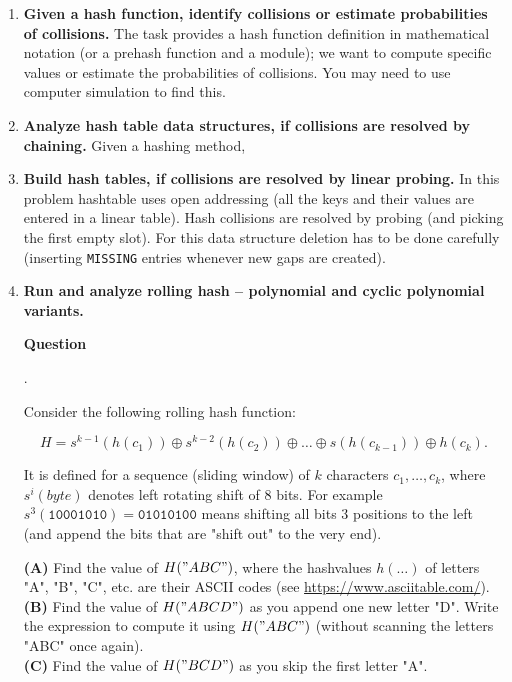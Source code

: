 \documentclass[a4paper,12pt]{article}
\newcounter{mcounter}
\newcommand\showmcounter{\addtocounter{mcounter}{1}\themcounter}
\begin{document}
{\begin{enumerate}[label=3.\Alph*.]
{\bf (A)} Implement map ADT using just some instances of "stack" data structure (instructors know how to implement
{\tt Map[Keys,Values]} with two instances of {\tt Stack[Keys]} and two instances of 
{\tt Stack[Values]}).\\
{\bf (B)} Implement map ADT using a Binary Search Tree (BST).\\
{\bf (C)} Implement map ADT using a hashtable.

For each of the three methods and three functions find the worst-case time complexity 
as $O(f(n))$, where $n$ -- the number of entries in Map right before the function is called.

\item {\bf Given a hash function, identify collisions or estimate probabilities of collisions.} 
The task provides a hash function definition in mathematical notation
(or a prehash function and a module);
we want to compute specific values or estimate the probabilities of collisions.
You may need to use computer simulation to find this. 



\item {\bf Analyze hash table data structures, if collisions are resolved by chaining.}
Given a hashing method, 
\item {\bf Build hash tables, if collisions are resolved by linear probing.}
In this problem hashtable uses open addressing (all the keys and their values are entered
in a linear table). Hash collisions are resolved by probing (and picking the first empty slot). 
For this data structure deletion has to be done carefully (inserting {\tt MISSING} entries
whenever new gaps are created). 
\item {\bf Run and analyze rolling hash – polynomial and cyclic polynomial variants.}

\vspace{10pt}
{\bf Question \showmcounter.}
Consider the following rolling hash function: 

\[ H = s^{k-1}(h( c_1 )) \oplus s^{k-2}( h(c_2) )  \oplus \ldots \oplus  s( h(c_{k-1}) ) \oplus   h(c_k). \]

It is defined for a sequence (sliding window)
of $k$ characters $c_1,\ldots,c_k$, where $s^i(byte)$ denotes left rotating shift of 
$8$ bits. For example $s^3(\mathtt{10001010}) = \mathtt{01010100}$ means shifting all 
bits 3 positions to the left (and append the bits that are "shift out" to the very end). 

{\bf (A)} Find the value of $H("ABC")$, where the hashvalues $h(\ldots)$ of letters "A", "B", "C", etc. 
are their ASCII codes (see \url{https://www.asciitable.com/}).\\
{\bf (B)} Find the value of $H("ABCD")$ as you append one new letter "D". 
Write the expression to compute it using $H("ABC")$ (without scanning the letters "ABC" once again).\\
{\bf (C)} Find the value of $H("BCD")$ as you skip the first letter "A". 


\end{enumerate}}
\end{document}
